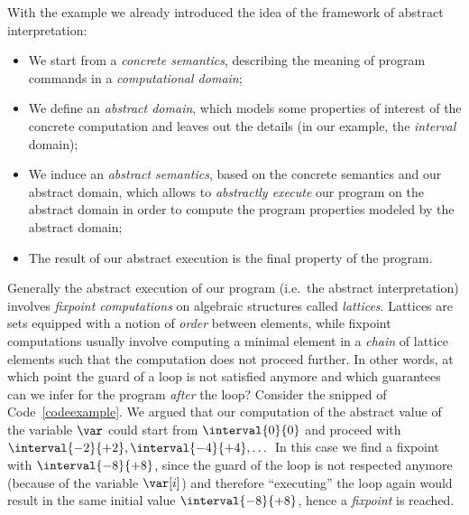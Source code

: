 \medskip

\noindent
With the example we already introduced the idea of the framework of
abstract interpretation:
\begin{itemize}
\item We start from a \emph{concrete semantics}, describing the
  meaning of program commands in a \emph{computational domain};
\item We define an \emph{abstract domain}, which models some
  properties of interest of the concrete computation and leaves out
  the details (in our example, the \emph{interval} domain);
\item We induce an \emph{abstract semantics}, based on the concrete
  semantics and our abstract domain, which allows to \emph{abstractly
    execute} our program on the abstract domain in order to compute
  the program properties modeled by the abstract domain;
\item The result of our abstract execution is the final property of
  the program.
\end{itemize}
Generally the abstract execution of our program (i.e.\ the abstract
interpretation) involves \emph{fixpoint computations} on algebraic
structures called \emph{lattices}. Lattices are sets equipped with a
notion of \emph{order} between elements, while fixpoint computations
usually involve computing a minimal element in a \emph{chain} of
lattice elements such that the computation does not proceed further.
In other words, at which point the guard of a loop is not satisfied
anymore and which guarantees can we infer for the program \emph{after}
the loop? Consider the snipped of Code~\ref{codeexample}. We argued
that our computation of the abstract value of the variable \(\var\)
could start from \(\interval{0}{0}\) and proceed with
\(\interval{-2}{+2}, \interval{-4}{+4}, \dots\) In this case we find a
fixpoint with \(\interval{-8}{+8}\), since the guard of the loop is
not respected anymore (because of the variable \(\var[i]\)) and
therefore ``executing'' the loop again would result in the same
initial value \(\interval{-8}{+8}\), hence a \emph{fixpoint} is
reached.

\medskip

